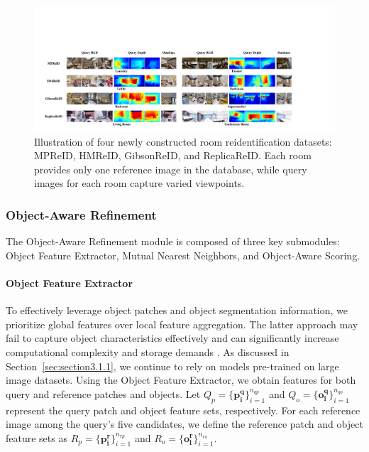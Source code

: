 \begin{figure}[t]
    \centering
    \includegraphics[width=\textwidth]{dataset_font.pdf}
    \vspace{-20pt}
    \caption{Illustration of four newly constructed room reidentification datasets: MPReID, HMReID, GibsonReID, and ReplicaReID. Each room provides only one reference image in the database, while query images for each room capture varied viewpoints.}
    \vspace{-10pt}
    \label{fig:dataset_image}
\end{figure}

\subsubsection{Object-Aware Refinement}
\label{subsec:refinement}

The Object-Aware Refinement module is composed of three key submodules: Object Feature Extractor, Mutual Nearest Neighbors, and Object-Aware Scoring.

\vspace{-6pt}
\paragraph{Object Feature Extractor}

To effectively leverage object patches and object segmentation information, we prioritize global features over local feature aggregation. The latter approach may fail to capture object characteristics effectively and can significantly increase computational complexity and storage demands \cite{zheng2018sift}. As discussed in Section~\ref{sec:section3.1.1}, we continue to rely on models pre-trained on large image datasets. Using the Object Feature Extractor, we obtain features for both query and reference patches and objects. Let \(Q_p=\{\mathbf{p_i^q}\}_{i=1}^{n_{qp}}\) and \(Q_o=\{\mathbf{o_i^q}\}_{i=1}^{n_{qo}}\) represent the query patch and object feature sets, respectively. For each reference image among the query’s five \mbox{candidates}, we define the reference patch and object feature sets as \(R_p=\{\mathbf{p_i^r}\}_{i=1}^{n_{rp}}\) and \(R_o=\{\mathbf{o_i^r}\}_{i=1}^{n_{ro}}\).

